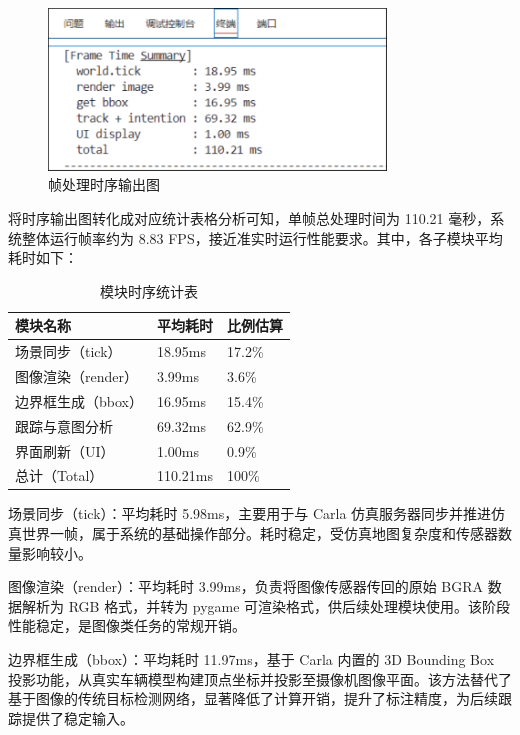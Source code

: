 \begin{figure}[H]
    \centering
    \includegraphics[width=0.8\textwidth]{images/图11 帧处理时序输出图.pdf}  %
    \caption{帧处理时序输出图}
    \label{fig:example_image}  %
\end{figure}

将时序输出图转化成对应统计表格分析可知，单帧总处理时间为 110.21 毫秒，系统整体运行帧率约为 8.83 FPS，接近准实时运行性能要求。其中，各子模块平均耗时如下：

\begin{table}[htbp]
  \caption{模块时序统计表}
  \label{tab:timetable}
  \centering
  \begin{tabular}{lll}
    \toprule
    模块名称 & 平均耗时 & 比例估算 \\
    \midrule
    场景同步（tick） & 18.95ms & 17.2\% \\
    图像渲染（render） & 3.99ms & 3.6\% \\
    边界框生成（bbox） & 16.95ms & 15.4\% \\
    跟踪与意图分析 & 69.32ms & 62.9\% \\
    界面刷新（UI） & 1.00ms & 0.9\% \\
	总计（Total） & 110.21ms & 100\% \\
    \bottomrule
  \end{tabular}
\end{table}

场景同步（tick）：平均耗时 5.98ms，主要用于与 Carla 仿真服务器同步并推进仿真世界一帧，属于系统的基础操作部分。耗时稳定，受仿真地图复杂度和传感器数量影响较小。

图像渲染（render）：平均耗时 3.99ms，负责将图像传感器传回的原始 BGRA 数据解析为 RGB 格式，并转为 pygame 可渲染格式，供后续处理模块使用。该阶段性能稳定，是图像类任务的常规开销。

边界框生成（bbox）：平均耗时 11.97ms，基于 Carla 内置的 3D Bounding Box 投影功能，从真实车辆模型构建顶点坐标并投影至摄像机图像平面。该方法替代了基于图像的传统目标检测网络，显著降低了计算开销，提升了标注精度，为后续跟踪提供了稳定输入。

